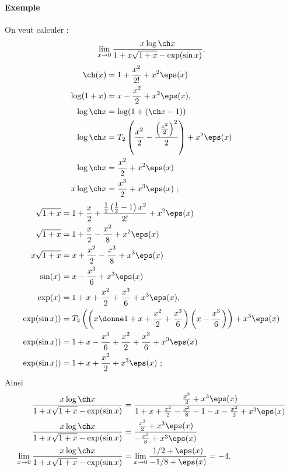 \documentclass{mybourbaki}
\begin{document}
\paragraph{Exemple}On veut calculer : \[ \lim_{x\to 0} \frac{x\log\ch x}{1+x\sqrt{1+x} - \exp(\sin x)}.\]
\begin{align*}
\ch(x) &= 1 +\frac{x^{2}}{2!} + x^{2}\eps(x) \\
\log(1+x) &= x - \frac{x^{2}}{2} +x^{2}\eps(x), \\
\log \ch x &= \log(1+(\ch x - 1)) \\
\log \ch x &= T_2\left( \frac{x^{2}}{2}  - \frac{\left(\frac{x^{2}}{2} \right)^{2}}{2}\right) + x^{2}\eps(x) \\
\log \ch x &= \frac{x^{2}}{2} + x^{2}\eps(x) \\
x\log\ch x &= \frac{x^{3}}{2} + x^{3}\eps(x) \ ;
\end{align*}
\begin{align*}
\sqrt{1+x} &= 1 + \frac{x}{2} + \frac{\frac{1}{2}\left(\frac{1}{2}-1\right)x^{2}}{2!} + x^{2}\eps(x) \\
\sqrt{1+x} &= 1 + \frac{x}{2} - \frac{x^{2}}{8} + x^{2}\eps(x)\\
x\sqrt{1+x} &= x + \frac{x^{2}}{2} - \frac{x^{3}}{8} + x^{3}\eps(x) \\
\sin(x) &= x - \frac{x^{3}}{6} + x^{3}\eps(x) \\
\exp(x) &= 1 + x + \frac{x^{2}}{2} + \frac{x^{3}}{6} +x^{3}\eps(x), \\
\exp(\sin x)) &= T_3\left( \left(x\donne 1 + x + \frac{x^{2}}{2} + \frac{x^{3}}{6} \right) \left( x - \frac{x^{3}}{6}\right)\right) + x^{3}\eps(x) \\
\exp(\sin x)) &= 1 + x - \frac{x^{3}}{6} + \frac{x^{2}}{2} + \frac{x^{3}}{6} + x^{3}\eps(x) \\
\exp(\sin x)) &= 1 + x + \frac{x^{2}}{2} + x^{3}\eps(x) \ ;
\end{align*}
Ainsi 
\begin{align*}
\frac{x\log\ch x}{1+x\sqrt{1+x} - \exp(\sin x)} &= \frac{ \frac{x^{3}}{2} + x^{3}\eps(x)}{1 +x + \frac{x^{2}}{2} - \frac{x^{3}}{8}  -1 - x - \frac{x^{2}}{2} + x^{3}\eps(x)}\\
\frac{x\log\ch x}{1+x\sqrt{1+x} - \exp(\sin x)} &= \frac{\frac{x^{3}}{2} + x^{3}\eps(x)}{-\frac{x^{3}}{8} + x^{3}\eps(x)} \\
\lim_{x\to 0}\frac{x\log\ch x}{1+x\sqrt{1+x} - \exp(\sin x)} &=\lim_{x\to 0} \frac{1/2 + \eps(x)}{-1/8 + \eps(x)} = -4.
\end{align*}
\end{document}
